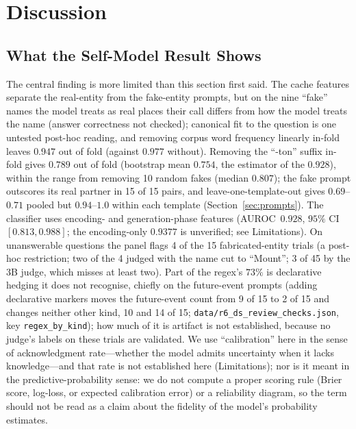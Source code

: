 \documentclass[11pt,a4paper]{article}
\begin{document}
\section{Discussion}

\subsection{What the Self-Model Result Shows}

The central finding is more limited than this section first said. The
cache features separate the real-entity from the fake-entity prompts,
but on the nine ``fake'' names the model treats as real places their call differs from how the model treats the name (answer correctness not checked); canonical fit to the question is one untested post-hoc reading, and removing corpus word frequency linearly in-fold leaves $0.947$ out of fold (against $0.977$ without). Removing the ``-ton'' suffix in-fold gives $0.789$ out of fold (bootstrap mean $0.754$, the estimator of the $0.928$), within the range from removing 10 random fakes (median $0.807$); the fake prompt outscores its real partner in 15 of 15 pairs,
and leave-one-template-out gives $0.69$--$0.71$ pooled but
$0.94$--$1.0$ within each template (Section~\ref{sec:prompts}). The
classifier uses encoding- and
generation-phase features (AUROC~$0.928$, $95\%$ CI $[0.813, 0.988]$;
the encoding-only $0.9377$ is unverified; see Limitations). On unanswerable questions the panel flags 4 of the 15 fabricated-entity trials (a post-hoc restriction; two of the 4 judged with the name cut to ``Mount''; 3 of 45 by the 3B judge, which misses at least two). Part of the regex's $73\%$ is declarative hedging it does not recognise,
chiefly on the future-event prompts (adding declarative markers moves the
future-event count from 9 of 15 to 2 of 15 and changes neither other kind,
10 and 14 of 15; \texttt{data/\allowbreak r6\_\allowbreak ds\_\allowbreak review\_\allowbreak checks.json}, key
\texttt{regex\_by\_kind}); how much of it is artifact is not established,
because no judge's labels on these trials are validated. We use ``calibration'' here in the sense
of acknowledgment rate---whether the model admits uncertainty when
it lacks knowledge---and that rate is not established here (Limitations);
nor is it meant in the predictive-probability sense: we do not
compute a proper scoring rule (Brier score, log-loss, or expected
calibration error) or a reliability diagram, so the term should not be
read as a claim about the fidelity of the model's probability estimates.
\end{document}

